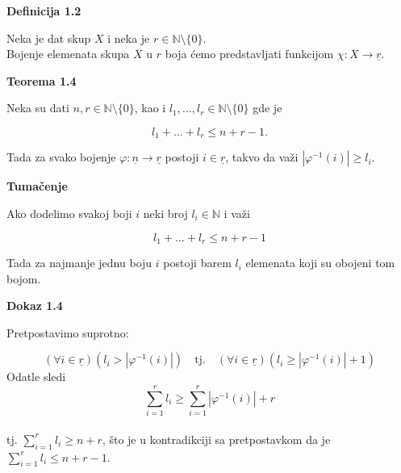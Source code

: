 \documentclass[12pt,a4paper]{article}
\begin{document}
	\begin{mdframed}	
	{\noindent\fontsize{12pt}{12pt}\textbf{Definicija 1.2}}
	\vspace{0.5em}

	\noindent Neka je dat skup $X$ i neka je $r \in \mathbb{N} \setminus \lbrace 0 \rbrace$.\\
	Bojenje elemenata skupa $X$ u $r$ boja ćemo predstavljati funkcijom $\chi : X \rightarrow \underline{r}$.
	\end{mdframed}
	
		\vspace{1em}	
	
	{\noindent\fontsize{12pt}{12pt}\textbf{Teorema 1.4}}
	\vspace{0.5em}

	\noindent Neka su dati $n, r \in \mathbb{N} \setminus \lbrace0\rbrace$, kao i $l_{1},...,l_{r} \in \mathbb{N} \setminus \lbrace0\rbrace$ gde je
	
	\[l_{1}+\dots+l_{r} \leq n+r-1.\]

	\noindent Tada za svako bojenje $\varphi:\underline{n} \rightarrow \underline{r}$ postoji $i \in \underline{r}$, takvo da važi $|\varphi^{-1}(i)| \geq l_{i}.$
	\vspace{1.5em}

	{\noindent\fontsize{12pt}{12pt}\textbf{Tumačenje}}
	\vspace{0.5em}

	\noindent Ako dodelimo svakoj boji $i$
	neki broj $l_{i} \in \mathbb{N}$ i važi
	\vspace{0.5em}

	\[l_{1}+\dots+l_{r} \leq n+r-1\]
	\vspace{0.5em}

	\noindent Tada za najmanje jednu boju $i$ postoji barem $l_{i}$ elemenata koji su obojeni tom bojom.

	\vspace{1.5em}

	{\noindent\fontsize{12pt}{12pt}\textbf{Dokaz 1.4}}
	\vspace{0.5em}

	\noindent Pretpostavimo suprotno:

	\[(\forall i \in \underline{r}) (l_{i} > |\varphi^{-1}(i)|) \quad \text{tj.}\quad (\forall i \in \underline{r})(l_{i} \geq |\varphi^{-1}(i)|+1)\]
	Odatle sledi \[ \sum_{i=1}^{r} l_{i} \geq \sum_{i=1}^{r}|\varphi^{-1}(i)|+r\] 
	\\tj. $ \sum_{i=1}^{r} l_{i} \geq n+r$,
	što je u kontradikciji sa pretpostavkom da je $\sum_{i=1}^{r} l_{i} \leq n+r-1$.
\end{document}
